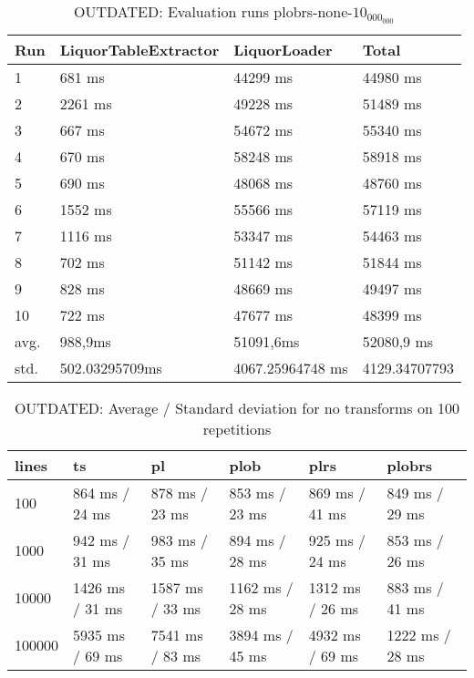 \begin{table}[ht]
	\caption{OUTDATED: Evaluation runs plobrs-none-$10_000_000$}
	\label{tab:eval:plobrs-none-10_000_000}
	\begin{tabular}{|l|l|l|l|}
		\hline
		Run  & LiquorTableExtractor & LiquorLoader     & Total         \\
		\hline
		1    & 681 ms               & 44299 ms         & 44980 ms      \\
		2    & 2261 ms              & 49228 ms         & 51489 ms      \\
		3    & 667 ms               & 54672 ms         & 55340 ms      \\
		4    & 670 ms               & 58248 ms         & 58918 ms      \\
		5    & 690 ms               & 48068 ms         & 48760 ms      \\
		6    & 1552 ms              & 55566 ms         & 57119 ms      \\
		7    & 1116 ms              & 53347 ms         & 54463 ms      \\
		8    & 702 ms               & 51142 ms         & 51844 ms      \\
		9    & 828 ms               & 48669 ms         & 49497 ms      \\
		10   & 722 ms               & 47677 ms         & 48399 ms      \\
		\hline
		avg. & 988,9ms              & 51091,6ms        & 52080,9 ms    \\
		std. & 502.03295709ms       & 4067.25964748 ms & 4129.34707793 \\
		\hline
	\end{tabular}
\end{table}
\begin{table}[ht]
	\caption{OUTDATED: Average / Standard deviation for no transforms on 100 repetitions}
	\label{outdated:tab:eval:none}
	\begin{tabular}{|l|l|l|l|l|l|}
		\hline
		lines  & ts              & pl              & plob            & plrs            & plobrs          \\
		\hline
		100    & 864 ms / 24 ms  & 878 ms / 23 ms  & 853 ms / 23 ms  & 869 ms / 41 ms  & 849 ms / 29 ms  \\
		1000   & 942 ms / 31 ms  & 983 ms / 35 ms  & 894 ms / 28 ms  & 925 ms / 24 ms  & 853 ms / 26 ms  \\
		10000  & 1426 ms / 31 ms & 1587 ms / 33 ms & 1162 ms / 28 ms & 1312 ms / 26 ms & 883 ms / 41 ms  \\
		100000 & 5935 ms / 69 ms & 7541 ms / 83 ms & 3894 ms / 45 ms & 4932 ms / 69 ms & 1222 ms / 28 ms \\
		\hline
	\end{tabular}
\end{table}
